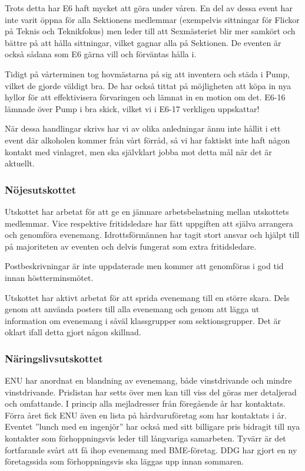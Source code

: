 \documentclass[../_main/handlingar.tex]{subfiles}
\begin{document}
Trots detta har E6 haft mycket att göra under våren. En del av dessa event har inte varit öppna för alla Sektionens medlemmar (exempelvis sittningar för Flickor på Teknis och Teknikfokus) men leder till att Sexmästeriet blir mer samkört och bättre på att hålla sittningar, vilket gagnar alla på Sektionen. De eventen är också sådana som E6 gärna vill och förväntas hålla i.

Tidigt på vårterminen tog hovmästarna på sig att inventera och städa i Pump, vilket de gjorde väldigt bra. De har också tittat på möjligheten att köpa in nya hyllor för att effektivisera förvaringen och lämnat in en motion om det. E6-16 lämnade över Pump i bra skick, vilket vi i E6-17 verkligen uppskattar!

När dessa handlingar skrivs har vi av olika anledningar ännu inte hållit i ett event där alkoholen kommer från vårt förråd, så vi har faktiskt inte haft någon kontakt med vinlagret, men ska självklart jobba mot detta mål när det är aktuellt.

\subsubsection*{Nöjesutskottet}
Utskottet har arbetat för att ge en jämnare arbetsbelastning mellan utskottets medlemmar. Vice respektive fritidsledare har fått uppgiften att själva arrangera och genomföra evenemang. Idrottsförmännen har tagit stort ansvar och hjälpt till på majoriteten av eventen och delvis fungerat som extra fritidsledare. 
     
Postbeskrivningar är inte uppdaterade men kommer att genomföras i god tid innan höstterminsmötet. 
     
Utskottet har aktivt arbetat för att sprida evenemang till en större skara. Dels genom att använda posters till alla evenemang och genom att lägga ut information om evenemang i såväl klassgrupper som sektionsgrupper. Det är oklart ifall detta gjort någon skillnad. 


\subsubsection*{Näringslivsutskottet}
ENU har anordnat en blandning av evenemang, både vinstdrivande och mindre vinstdrivande.  Prislistan har setts över men kan till viss del göras mer detaljerad och omfattande. I princip alla mejladresser från föregående år har kontaktats. Förra året fick ENU även en lista på hårdvaruföretag som har kontaktats i år. Eventet ”lunch med en ingenjör” har också med sitt billigare pris bidragit till nya kontakter som förhoppningsvis leder till långvariga samarbeten. Tyvärr är det fortfarande svårt att få ihop evenemang med BME-företag. DDG har gjort en ny företagssida som förhoppningsvis ska läggas upp innan sommaren. 
\end{document}
